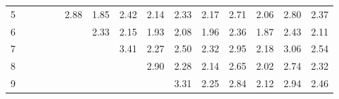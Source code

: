 \documentclass[a4paper, 11pt, ngerman]{article}
\theoremstyle{definition}
\theoremstyle{plain}
\theoremstyle{remark}
\begin{document}
\begin{figure}
\begin{tabular}{c|cccccccccccccc}
        5                    &                                  &                                  &                                  &                                  & \textcolor[HTML]{ 8c2072 }{2.88} & \textcolor[HTML]{ 3f20bf }{1.85} & \textcolor[HTML]{ 6a2094 }{2.42} & \textcolor[HTML]{ 5420aa }{2.14} & \textcolor[HTML]{ 63209b }{2.33} & \textcolor[HTML]{ 5720a7 }{2.17} & \textcolor[HTML]{ 7f207f }{2.71} & \textcolor[HTML]{ 4e20b0 }{2.06} & \textcolor[HTML]{ 862078 }{2.80} & \textcolor[HTML]{ 662098 }{2.37} \\
        6                    &                                  &                                  &                                  &                                  &                                  & \textcolor[HTML]{ 63209b }{2.33} & \textcolor[HTML]{ 5620a8 }{2.15} & \textcolor[HTML]{ 4520b9 }{1.93} & \textcolor[HTML]{ 5020ae }{2.08} & \textcolor[HTML]{ 4720b7 }{1.96} & \textcolor[HTML]{ 652099 }{2.36} & \textcolor[HTML]{ 4020be }{1.87} & \textcolor[HTML]{ 6a2094 }{2.43} & \textcolor[HTML]{ 5220ac }{2.11} \\
        7                    &                                  &                                  &                                  &                                  &                                  &                                  & \textcolor[HTML]{ b4204a }{3.41} & \textcolor[HTML]{ 5f209f }{2.27} & \textcolor[HTML]{ 70208e }{2.50} & \textcolor[HTML]{ 62209c }{2.32} & \textcolor[HTML]{ 91206d }{2.95} & \textcolor[HTML]{ 5820a6 }{2.18} & \textcolor[HTML]{ 992065 }{3.06} & \textcolor[HTML]{ 73208b }{2.54} \\
        8                    &                                  &                                  &                                  &                                  &                                  &                                  &                                  & \textcolor[HTML]{ 8d2071 }{2.90} & \textcolor[HTML]{ 60209e }{2.28} & \textcolor[HTML]{ 5420aa }{2.14} & \textcolor[HTML]{ 7b2083 }{2.65} & \textcolor[HTML]{ 4c20b2 }{2.02} & \textcolor[HTML]{ 82207c }{2.74} & \textcolor[HTML]{ 63209b }{2.32} \\
        9                    &                                  &                                  &                                  &                                  &                                  &                                  &                                  &                                  & \textcolor[HTML]{ ac2052 }{3.31} & \textcolor[HTML]{ 5d20a1 }{2.25} & \textcolor[HTML]{ 892075 }{2.84} & \textcolor[HTML]{ 5420aa }{2.12} & \textcolor[HTML]{ 91206d }{2.94} & \textcolor[HTML]{ 6d2091 }{2.46} \\

\end{tabular}
\end{figure}
\end{document}
